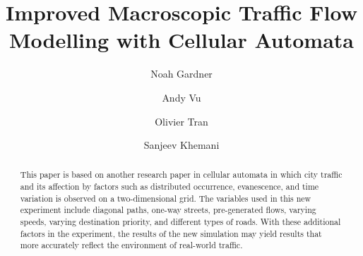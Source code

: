 \documentclass[sigplan,screen]{acmart}
\begin{document}
\title{Improved Macroscopic Traffic Flow Modelling with Cellular Automata}

\author{Noah Gardner}

\author{Andy Vu}
\authornotemark[1]

\author{Olivier Tran}
\authornotemark[1]

\author{Sanjeev Khemani}
\authornotemark[1]

\renewcommand{\shortauthors}{Gardner et al.}

\begin{abstract}
    This paper is based on another research paper in cellular automata in which
    city traffic and its affection by factors such as distributed occurrence,
    evanescence, and time variation is observed on a two-dimensional grid. The
    variables used in this new experiment include diagonal paths, one-way streets,
    pre-generated flows, varying speeds, varying destination priority, and
    different types of roads. With these additional factors in the experiment, the
    results of the new simulation may yield results that more accurately reflect
    the environment of real-world traffic.
\end{abstract}
\end{document}
